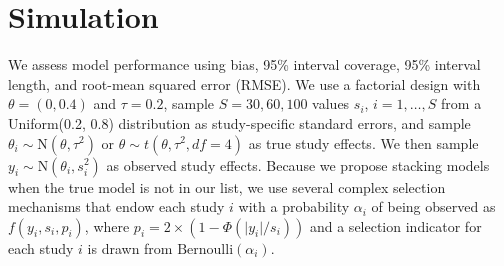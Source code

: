\documentclass[12pt]{article}   	%
\numberwithin{equation}{section}
\begin{document}
\section{Simulation} \label{sec:simulation}

We assess model performance using bias, 95\% interval coverage, 95\% interval length, and root-mean squared error (RMSE). We use a factorial design with $\theta = (0, 0.4)$ and $\tau = 0.2$, sample $S = 30, 60, 100$ values $s_i$, $i = 1, \dots, S$ from a Uniform(0.2, 0.8) distribution as study-specific standard errors, and sample $\theta_i \sim \text{N}(\theta, \tau^2)$ or $\theta \sim t(\theta, \tau^2, df = 4)$ as true study effects. We then sample $y_i \sim \text{N}(\theta_i, s_i^2)$ as observed study effects. Because we propose stacking models when the true model is not in our list, we use several complex selection mechanisms that endow each study $i$ with a probability $\alpha_i$ of being observed as $f(y_i, s_i, p_i)$, where $p_i = 2 \times (1 - \Phi(\vert y_i \vert / s_i))$ and a selection indicator for each study $i$ is drawn from $\text{Bernoulli}(\alpha_i)$.





%
%



\end{document}
